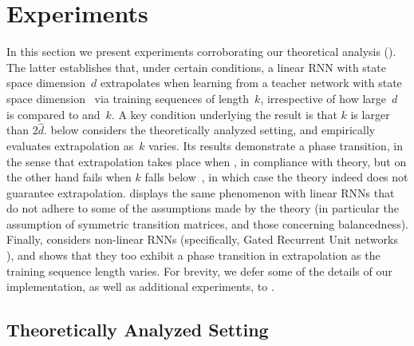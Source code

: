 \section{Experiments}
\label{sec:experiments}

In this section we present experiments corroborating our theoretical analysis ().
The latter establishes that, under certain conditions, a linear RNN with state space dimension~$d$ extrapolates when learning from a teacher network with state space dimension~ via training sequences of length~$k$, irrespective of how large~$d$ is compared to  and~$k$. %
A key condition underlying the result is that $k$ is larger than $2 \hat{d}$.
 below considers the theoretically analyzed setting, and empirically evaluates extrapolation as~$k$ varies.
Its results demonstrate a phase transition, in the sense that extrapolation takes place when , in compliance with theory, but on the other hand fails when $k$ falls below~, in which case the theory indeed does not guarantee extrapolation.
 displays the same phenomenon with linear RNNs that do not adhere to some of the assumptions made by the theory (in particular the assumption of symmetric transition matrices, and those concerning balancedness).
Finally,  considers non-linear RNNs (specifically, Gated Recurrent Unit networks \cite{chung2014empirical}), and shows that they too exhibit a phase transition in extrapolation as the training sequence length varies.
For brevity, we defer some of the details of our implementation, as well as additional experiments, to .

\subsection{Theoretically Analyzed Setting} \label{sec:exp:sym_teacher}

